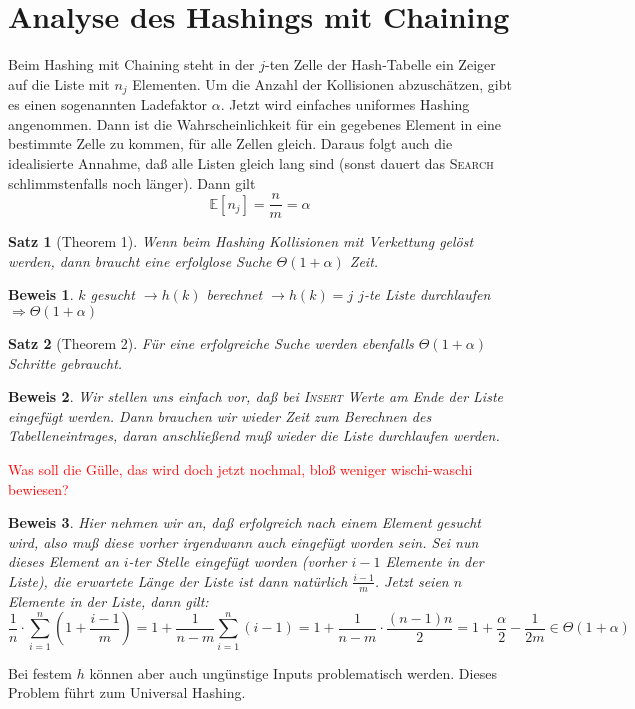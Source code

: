 \documentclass[ngerman,draft,parskip=half*,twoside]{scrreprt}
\theoremstyle{break}
\newtheorem{beweis}{Beweis}
\newtheorem{satz}{Satz}
\begin{document}
\section{Analyse des Hashings mit Chaining}
Beim Hashing mit Chaining steht in der $j$-ten Zelle der Hash-Tabelle ein Zeiger auf die Liste mit $n_j$ Elementen. Um
die Anzahl der Kollisionen abzuschätzen, gibt es einen sogenannten Ladefaktor $\alpha$.
Jetzt wird einfaches uniformes Hashing angenommen. Dann ist die Wahrscheinlichkeit für ein gegebenes Element in eine bestimmte
Zelle zu kommen, für alle Zellen gleich. Daraus folgt auch die idealisierte Annahme, daß alle Listen gleich lang sind
(sonst dauert das \textsc{Search} schlimmstenfalls noch länger). Dann gilt \[\mathbb{E}[n_j]=\frac{n}{m}=\alpha\]

\begin{satz}[Theorem 1]
Wenn beim Hashing Kollisionen mit Verkettung gelöst werden, dann braucht eine erfolglose Suche $\Theta(1+\alpha)$
Zeit.
\end{satz}
\begin{beweis}
$k$ gesucht $\rightarrow h(k)$ berechnet $\rightarrow h(k)=j$ $j$-te Liste durchlaufen $\Rightarrow \Theta(1+\alpha)$
\end{beweis}

\begin{satz}[Theorem 2]
Für eine erfolgreiche Suche werden ebenfalls $\Theta(1+\alpha)$ Schritte gebraucht.
\end{satz}
\begin{beweis}
Wir stellen uns einfach vor, daß bei \textsc{Insert} Werte am Ende der Liste eingefügt werden. Dann brauchen wir
wieder Zeit zum Berechnen des Tabelleneintrages, daran anschließend muß wieder die Liste durchlaufen werden.
\end{beweis} \textcolor{red}{Was soll die Gülle, das wird doch jetzt nochmal, bloß weniger wischi-waschi bewiesen?}
\begin{beweis}
Hier nehmen wir an, daß erfolgreich nach einem Element gesucht wird, also muß diese vorher irgendwann auch eingefügt
worden sein. Sei nun dieses Element an $i$-ter Stelle eingefügt worden (vorher $i-1$ Elemente in der Liste), die
erwartete Länge der Liste ist dann natürlich $\frac{i-1}{m}$. Jetzt seien $n$ Elemente in der Liste, dann gilt:
\[\frac{1}{n} \cdot \sum_{i=1}^n \left(1+\frac{i-1}{m}\right)=1+\frac{1}{n-m} \sum_{i=1}^n (i-1)=1+\frac{1}{n-m} \cdot
\frac{(n-1)n}{2}=1+\frac{\alpha}{2}-\frac{1}{2m} \in \Theta(1+\alpha)\]
\end{beweis}
Bei festem $h$ können aber auch ungünstige Inputs problematisch werden. Dieses Problem führt zum Universal Hashing.
\end{document}

